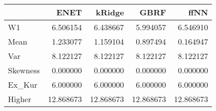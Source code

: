 \begin{tabular}{lrrrr}
\toprule
{} &       ENET &     kRidge &       GBRF &       ffNN \\
\midrule
W1       &   6.506154 &   6.438667 &   5.994057 &   6.546910 \\
Mean     &   1.233077 &   1.159104 &   0.897494 &   0.164947 \\
Var      &   8.122127 &   8.122127 &   8.122127 &   8.122127 \\
Skewness &   0.000000 &   0.000000 &   0.000000 &   0.000000 \\
Ex\_Kur   &   6.000000 &   6.000000 &   6.000000 &   6.000000 \\
Higher   &  12.868673 &  12.868673 &  12.868673 &  12.868673 \\
\bottomrule
\end{tabular}
